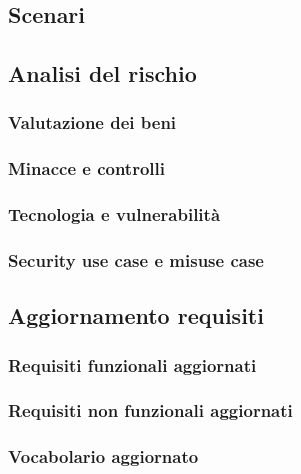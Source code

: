 \documentclass{article}
\begin{document}
\subsection{\Large Scenari}


\subsection{\Large Analisi del rischio}
\subsubsection{\Large Valutazione dei beni}

\subsubsection{\Large Minacce e controlli}

\subsubsection{\Large Tecnologia e vulnerabilità}

\subsubsection{\Large Security use case e misuse case}


\subsection{\Large Aggiornamento requisiti}
\subsubsection{\Large Requisiti funzionali aggiornati}

\subsubsection{\Large Requisiti non funzionali aggiornati}

\subsubsection{\Large Vocabolario aggiornato}

\end{document}
